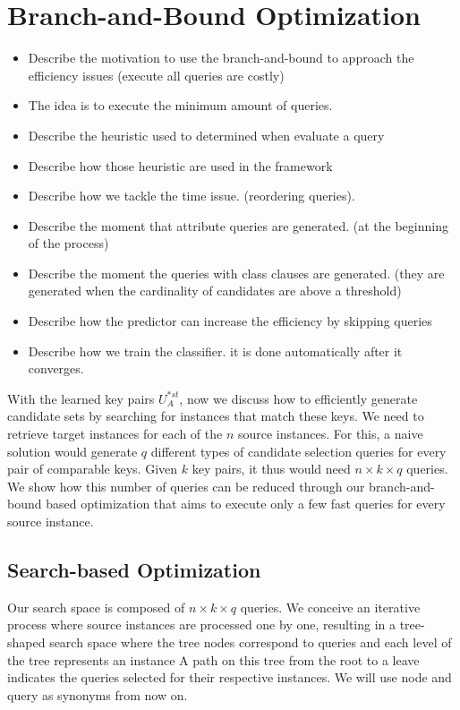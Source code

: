 \section{Branch-and-Bound Optimization}

\begin{itemize}
\item Describe the motivation to use the branch-and-bound to approach the efficiency issues (execute all queries are costly)
\item The idea is to execute the minimum amount of queries.
\item Describe the heuristic used to determined when evaluate a query
\item Describe how those heuristic are used in the framework
\item Describe how we tackle the time issue.  (reordering queries).
\item Describe the moment  that attribute queries are generated. (at the beginning of the process)
\item Describe the moment the queries with class clauses are generated. (they are generated when the cardinality of candidates are above a threshold)
\item Describe how the predictor can increase the efficiency by skipping queries
\item Describe how we train the classifier. it is done automatically after it converges.
\end{itemize}

With the learned key pairs $U^{*st}_A$, now we discuss how to efficiently generate candidate sets by searching for instances that match these keys. We need to retrieve target instances for each of the $n$ source instances. For this, a naive solution would generate $q$ different types of candidate selection queries for every pair of comparable keys. Given $k$ key pairs, it thus would need $n \times k \times q$ queries. We show how this number of queries can be reduced through our branch-and-bound based optimization that aims to execute only a few fast queries for every source instance. 

 
\subsection{Search-based Optimization} 
Our search space is composed of $n \times k \times q$ queries. We conceive an iterative process where source instances are processed one by one, resulting in a tree-shaped search space where the tree nodes correspond to queries and each level of the tree represents an instance  A path on this tree from the root to a leave indicates the queries selected for their respective instances. We will use node and query as synonyms from now on.

